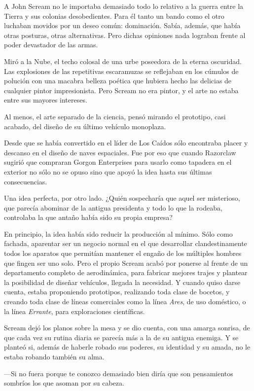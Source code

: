 A John Scream no le importaba demasiado todo lo relativo a la guerra entre la Tierra y sus colonias desobedientes. Para él tanto un bando como el otro luchaban movidos por un deseo común: dominación. Sabía, además, que había otras posturas, otras alternativas. Pero dichas opiniones nada lograban frente al poder devastador de las armas.

Miró a la Nube, el techo colosal de una urbe poseedora de la eterna oscuridad. Las explosiones de las repetitivas escaramuzas se reflejaban en los cúmulos de polución con una macabra belleza poética que hubiera hecho las delicias de cualquier pintor impresionista. Pero Scream no era pintor, y el arte no estaba entre sus mayores intereses.

Al menos, el arte separado de la ciencia, pensó mirando el prototipo, casi acabado, del diseño de su último vehículo monoplaza.

Desde que se había convertido en el líder de Los Caídos sólo encontraba placer y descanso en el diseño de naves espaciales. Fue por eso que cuando Razorclaw sugirió que compraran Gorgon Enterprises para usarlo como tapadera en el exterior no sólo no se opuso sino que apoyó la idea hasta sus últimas consecuencias.

Una idea perfecta, por otro lado. ¿Quién sospecharía que aquel ser misterioso, que parecía abominar de la antigua presidenta y todo lo que la rodeaba, controlaba la que antaño había sido su propia empresa?

En principio, la idea había sido reducir la producción al mínimo. Sólo como fachada, aparentar ser un negocio normal en el que desarrollar clandestinamente todos los aparatos que permitían mantener el engaño de los múltiples hombres que fingen ser uno solo. Pero el propio Scream acabó por ponerse al frente de un departamento completo de aerodinámica, para fabricar mejores trajes y plantear la posibilidad de diseñar vehículos, llegada la necesidad. Y cuando quiso darse cuenta, estaba proponiendo prototipos, realizando toda clase de bocetos, y creando toda clase de líneas comerciales como la línea \emph{Ares}, de uso doméstico, o la línea \emph{Errante}, para exploraciones científicas.

Scream dejó los planos sobre la mesa y se dio cuenta, con una amarga sonrisa, de que cada vez su rutina diaria se parecía más a la de su antigua enemiga. Y se planteó si, además de haberle robado sus poderes, su identidad y su amada, no le estaba robando también su alma.

---Si no fuera porque te conozco demasiado bien diría que son pensamientos sombríos los que asoman por su cabeza.

